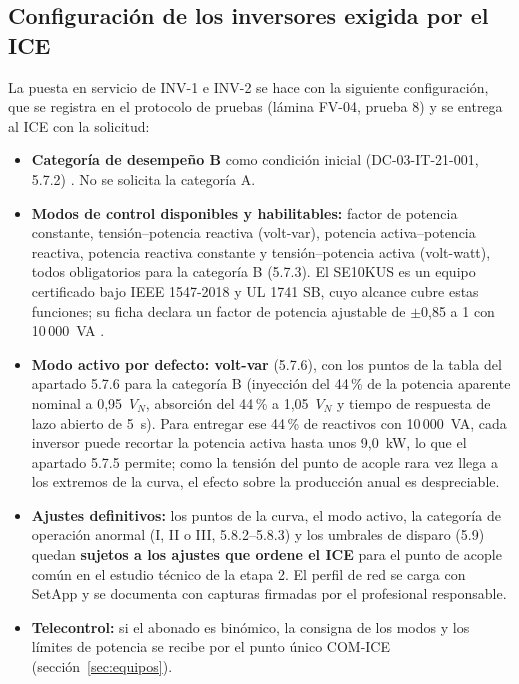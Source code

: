 \documentclass[12pt]{article}
\begin{document}
\subsection{Configuración de los inversores exigida por el ICE}
\label{sec:config_ice}
La puesta en servicio de INV-1 e INV-2 se hace con la siguiente configuración, que se registra en el protocolo de pruebas (lámina FV-04, prueba 8) y se entrega al ICE con la solicitud:
\begin{itemize}
\item \textbf{Categoría de desempeño B} como condición inicial (DC-03-IT-21-001, 5.7.2) \cite{iceIT}. No se solicita la categoría A.
\item \textbf{Modos de control disponibles y habilitables:} factor de potencia constante, tensión--potencia reactiva (volt-var), potencia activa--potencia reactiva, potencia reactiva constante y tensión--potencia activa (volt-watt), todos obligatorios para la categoría B (5.7.3). El SE10KUS es un equipo certificado bajo IEEE 1547-2018 y UL 1741 SB, cuyo alcance cubre estas funciones; su ficha declara un factor de potencia ajustable de $\pm$0,85 a 1 con 10\,000~VA \cite{seInv}.
\item \textbf{Modo activo por defecto: volt-var} (5.7.6), con los puntos de la tabla del apartado 5.7.6 para la categoría B (inyección del 44\,\% de la potencia aparente nominal a 0,95~$V_N$, absorción del 44\,\% a 1,05~$V_N$ y tiempo de respuesta de lazo abierto de 5~s). Para entregar ese 44\,\% de reactivos con 10\,000~VA, cada inversor puede recortar la potencia activa hasta unos 9,0~kW, lo que el apartado 5.7.5 permite; como la tensión del punto de acople rara vez llega a los extremos de la curva, el efecto sobre la producción anual es despreciable.
\item \textbf{Ajustes definitivos:} los puntos de la curva, el modo activo, la categoría de operación anormal (I, II o III, 5.8.2--5.8.3) y los umbrales de disparo (5.9) quedan \textbf{sujetos a los ajustes que ordene el ICE} para el punto de acople común en el estudio técnico de la etapa 2. El perfil de red se carga con SetApp y se documenta con capturas firmadas por el profesional responsable.
\item \textbf{Telecontrol:} si el abonado es binómico, la consigna de los modos y los límites de potencia se recibe por el punto único COM-ICE (sección~\ref{sec:equipos}).
\end{itemize}
\end{document}
